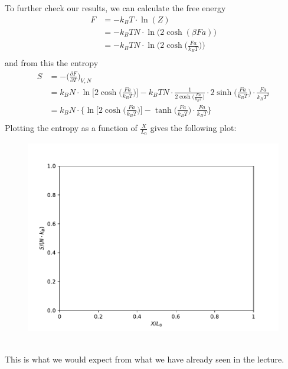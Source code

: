    \newpage \noindent
    To further check our results, we can calculate the free energy
    \begin{align}
        F
        &=-k_BT\cdot\ln(Z) \\
        &=-k_BTN\cdot\ln\bigg(2\cosh(\beta Fa)\bigg) \\
        &=-k_BTN\cdot\ln\bigg(2\cosh\bigg(\frac{Fa}{k_BT}\bigg)\bigg) \\
    \end{align}
    and from this the entropy
    \begin{align}
        S
        &=-\bigg(\frac{\partial F}{\partial T}\bigg)_{V,N} \\
        &=k_BN\cdot\ln\bigg[2\cosh\bigg(\frac{Fa}{k_BT}\bigg)\bigg]
        -k_BTN\cdot\frac{1}{2\cosh\bigg(\frac{Fa}{k_BT}\bigg)}\cdot
        2\sinh\bigg(\frac{Fa}{k_BT}\bigg)\cdot\frac{Fa}{k_BT^2} \\
        &=k_BN\cdot\bigg\{\ln\bigg[2\cosh\bigg(\frac{Fa}{k_BT}\bigg)\bigg]
        -\tanh\bigg(\frac{Fa}{k_BT}\bigg)\cdot\frac{Fa}{k_BT}\bigg\} \\
    \end{align}
    Plotting the entropy as a function of $\frac{X}{L_0}$ gives the following 
    plot:
    \begin{figure}[h!]
        \centering
        \includegraphics[width=.8\textwidth]{./figures/entropy.pdf}
    \end{figure} \ \\ 
    This is what we would expect from what we have already seen in the lecture.

